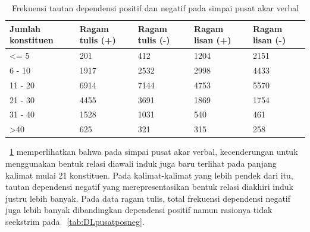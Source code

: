 \begin{table}
\begin{center}
\begin{small}
\caption{Frekuensi tautan dependensi positif dan negatif pada simpai pusat akar verbal}  \label{tab:tautanpusatposneg}
\begin{tabular}{ | p{2cm} | p{2cm} | p{2cm} | p{2cm} | p{2cm} |}
    \hline
Jumlah konstituen & Ragam tulis (+) & Ragam tulis (-) & Ragam lisan (+) & Ragam lisan (-) \\ \hline
\textless= 5 	& 201	& 412 & 1204 & 2151 \\ \hline
6 - 10 		& 1917	& 2532 & 2998 & 4433 \\ \hline
11 - 20 		& 6914 	& 7144 & 4753 & 5570 \\ \hline
21 - 30 		& 4455	& 3691 & 1869 & 1754 \\ \hline
31 - 40 		& 1528	& 1031 & 540 & 461 \\ \hline
\textgreater 40 	& 625	& 321 & 315 & 258 \\ \hline
   \end{tabular}
   \end{small}
\end{center}
\end{table}

\tab~\ref{tab:tautanpusatposneg} memperlihatkan bahwa pada simpai pusat akar verbal, kecenderungan untuk menggunakan bentuk relasi diawali induk juga baru terlihat pada panjang kalimat mulai 21 konstituen. Pada kalimat-kalimat yang lebih pendek dari itu, tautan dependensi negatif yang merepresentasikan bentuk relasi diakhiri induk justru lebih banyak. Pada data ragam tulis, total frekuensi dependensi negatif juga lebih banyak dibandingkan dependensi positif namun rasionya tidak seekstrim pada \tab~\ref{tab:DLpusatposneg}.

